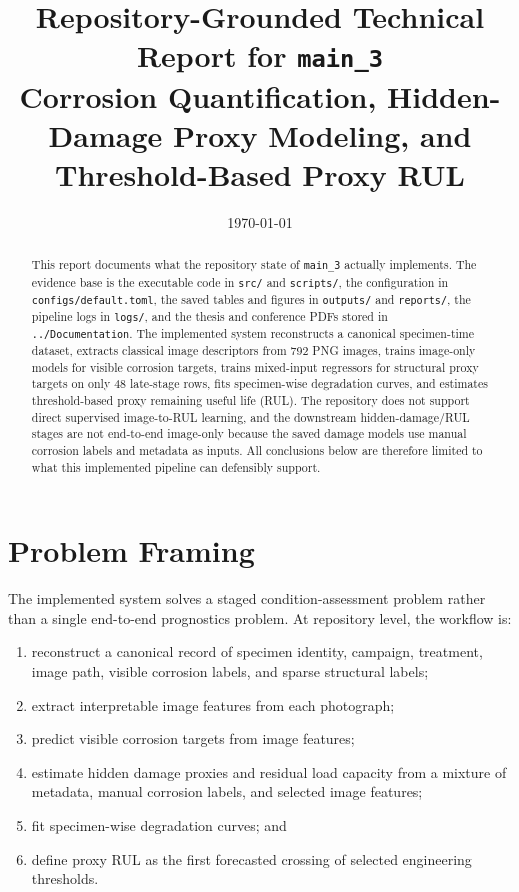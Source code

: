 \documentclass[11pt,a4paper]{article}
\title{Repository-Grounded Technical Report for \texttt{main\_3}\\Corrosion Quantification, Hidden-Damage Proxy Modeling, and Threshold-Based Proxy RUL}
\author{}
\date{\today}
\begin{document}
\maketitle
\tableofcontents
\clearpage

\begin{abstract}
This report documents what the repository state of \texttt{main\_3} actually implements. The evidence base is the executable code in \texttt{src/} and \texttt{scripts/}, the configuration in \texttt{configs/default.toml}, the saved tables and figures in \texttt{outputs/} and \texttt{reports/}, the pipeline logs in \texttt{logs/}, and the thesis and conference PDFs stored in \texttt{../Documentation}. The implemented system reconstructs a canonical specimen-time dataset, extracts classical image descriptors from 792 PNG images, trains image-only models for visible corrosion targets, trains mixed-input regressors for structural proxy targets on only 48 late-stage rows, fits specimen-wise degradation curves, and estimates threshold-based proxy remaining useful life (RUL). The repository does not support direct supervised image-to-RUL learning, and the downstream hidden-damage/RUL stages are not end-to-end image-only because the saved damage models use manual corrosion labels and metadata as inputs. All conclusions below are therefore limited to what this implemented pipeline can defensibly support.
\end{abstract}

\section{Problem Framing}

The implemented system solves a staged condition-assessment problem rather than a single end-to-end prognostics problem. At repository level, the workflow is:
\begin{enumerate}
  \item reconstruct a canonical record of specimen identity, campaign, treatment, image path, visible corrosion labels, and sparse structural labels;
  \item extract interpretable image features from each photograph;
  \item predict visible corrosion targets from image features;
  \item estimate hidden damage proxies and residual load capacity from a mixture of metadata, manual corrosion labels, and selected image features;
  \item fit specimen-wise degradation curves; and
  \item define proxy RUL as the first forecasted crossing of selected engineering thresholds.
\end{enumerate}
\end{document}
